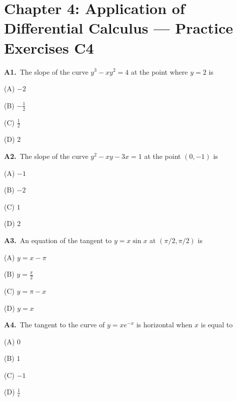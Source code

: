 \documentclass[11pt]{article}
\begin{document}
\section*{Chapter 4: Application of Differential Calculus --- Practice Exercises C4}

\bigskip\noindent\textbf{A1.}\ The slope of the curve $y^3 - xy^2 = 4$ at the point where $y=2$ is
\begin{list}{}{\setlength{\leftmargin}{3em}\setlength{\labelwidth}{2.5em}\setlength{\itemsep}{0pt}\setlength{\topsep}{2pt}}
\item[(A)] $-2$
\item[(B)] $-\frac12$
\item[(C)] $\frac12$
\item[(D)] $2$
\end{list}

\bigskip\noindent\textbf{A2.}\ The slope of the curve $y^2 - xy - 3x = 1$ at the point $(0,-1)$ is
\begin{list}{}{\setlength{\leftmargin}{3em}\setlength{\labelwidth}{2.5em}\setlength{\itemsep}{0pt}\setlength{\topsep}{2pt}}
\item[(A)] $-1$
\item[(B)] $-2$
\item[(C)] $1$
\item[(D)] $2$
\end{list}

\bigskip\noindent\textbf{A3.}\ An equation of the tangent to $y=x\sin x$ at $(\pi/2,\pi/2)$ is
\begin{list}{}{\setlength{\leftmargin}{3em}\setlength{\labelwidth}{2.5em}\setlength{\itemsep}{0pt}\setlength{\topsep}{2pt}}
\item[(A)] $y=x-\pi$
\item[(B)] $y=\frac\pi2$
\item[(C)] $y=\pi-x$
\item[(D)] $y=x$
\end{list}

\bigskip\noindent\textbf{A4.}\ The tangent to the curve of $y = xe^{-x}$ is horizontal when $x$ is equal to
\begin{list}{}{\setlength{\leftmargin}{3em}\setlength{\labelwidth}{2.5em}\setlength{\itemsep}{0pt}\setlength{\topsep}{2pt}}
\item[(A)] $0$
\item[(B)] $1$
\item[(C)] $-1$
\item[(D)] $\frac1e$
\end{list}
\end{document}
